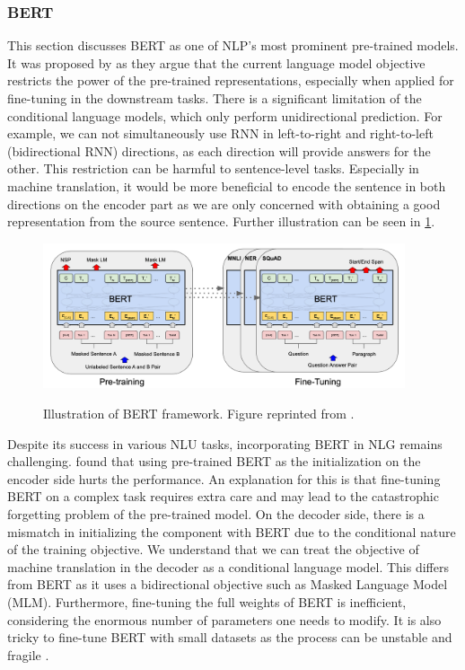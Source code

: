 \subsubsection{BERT}
This section discusses BERT as one of NLP's most prominent pre-trained models. It was proposed by  as they argue that the current language model objective restricts the power of the pre-trained representations, especially when applied for fine-tuning in the downstream tasks. There is a significant limitation of the conditional language models, which only perform unidirectional prediction. For example, we can not simultaneously use RNN in left-to-right and right-to-left (bidirectional RNN) directions, as each direction will provide answers for the other. This restriction can be harmful to sentence-level tasks. Especially in machine translation, it would be more beneficial to encode the sentence in both directions on the encoder part as we are only concerned with obtaining a good representation from the source sentence. Further illustration can be seen in \cref{img:bert}.

\begin{figure}[h]
    {\includegraphics[width=0.95\textwidth]{img/bert.png}}
    \centering
    \caption{Illustration of BERT framework. Figure reprinted from .}
    \label{img:bert}
\end{figure}

Despite its success in various NLU tasks, incorporating BERT in NLG remains challenging.  found that using pre-trained BERT as the initialization on the encoder side hurts the performance. An explanation for this is that fine-tuning BERT on a complex task requires extra care and may lead to the catastrophic forgetting problem  of the pre-trained model. On the decoder side, there is a mismatch in initializing the component with BERT due to the conditional nature of the training objective. We understand that we can treat the objective of machine translation in the decoder as a conditional language model. This differs from BERT as it uses a bidirectional objective such as Masked Language Model (MLM). Furthermore, fine-tuning the full weights of BERT is inefficient, considering the enormous number of parameters one needs to modify. It is also tricky to fine-tune BERT with small datasets as the process can be unstable and fragile .

